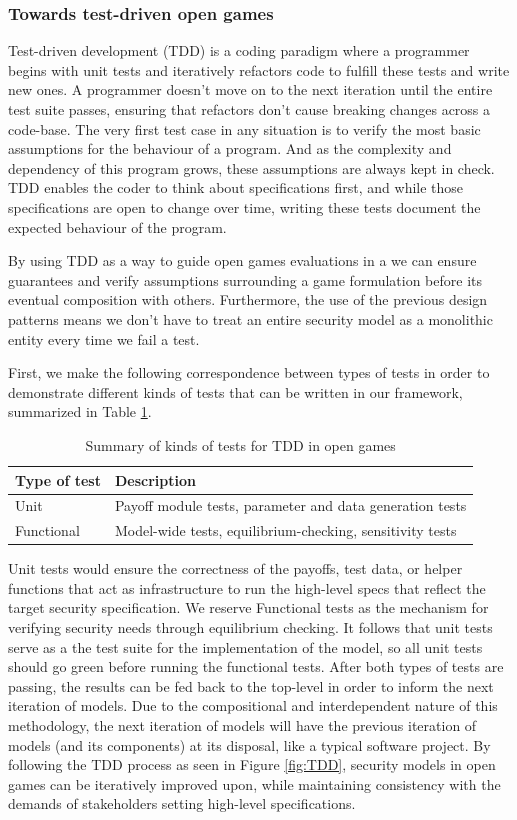 \documentclass[11pt,titlepage,dvipsnames,table,xcdraw,english]{article}
\begin{document}
\subsubsection{Towards test-driven open games}
Test-driven development (TDD) is a coding paradigm where a programmer begins with unit tests and iteratively refactors code to fulfill these tests and write new ones. A programmer doesn't move on to the next iteration until the entire test suite passes, ensuring that refactors don't cause breaking changes across a code-base. The very first test case in any situation is to verify the most basic assumptions for the behaviour of a program. And as the complexity and dependency of this program grows, these assumptions are always kept in check. TDD enables the coder to think about specifications first, and while those specifications are open to change over time, writing these tests document the expected behaviour of the program. 

By using TDD as a way to guide open games evaluations in a we can ensure guarantees and verify assumptions surrounding a game formulation before its eventual composition with others. Furthermore, the use of the previous design patterns means we don't have to treat an entire security model as a monolithic entity every time we fail a test. 

First, we make the following correspondence between types of tests in order to demonstrate different kinds of tests that can be written in our framework, summarized in Table \ref{table:TDD}. 


\begin{table}[h!]
\centering
\begin{tabularx}{\textwidth}{|l X|} 
 \hline
 Type of test & Description \\ [0.5ex] 
 \hline\hline
 Unit & Payoff module tests, parameter and data generation tests \\ 
 \hline
 Functional& Model-wide tests, equilibrium-checking, sensitivity tests \\ [1ex] 
 \hline
\end{tabularx}
\caption{Summary of kinds of tests for TDD in open games}
\label{table:TDD}
\end{table}

Unit tests would ensure the correctness of the payoffs, test data, or helper functions that act as infrastructure to run the high-level specs that reflect the target security specification. We reserve Functional tests as the mechanism for verifying security needs through equilibrium checking. It follows that unit tests serve as a the test suite for the implementation of the model, so all unit tests should go green before running the functional tests. After both types of tests are passing, the results can be fed back to the top-level in order to inform the next iteration of models. Due to the compositional and interdependent nature of this methodology, the next iteration of models will have the previous iteration of models (and its components) at its disposal, like a typical software project. By following the TDD process as seen in Figure \ref{fig:TDD}, security models in open games can be iteratively improved upon, while maintaining consistency with the demands of stakeholders setting high-level specifications. 
\end{document}
